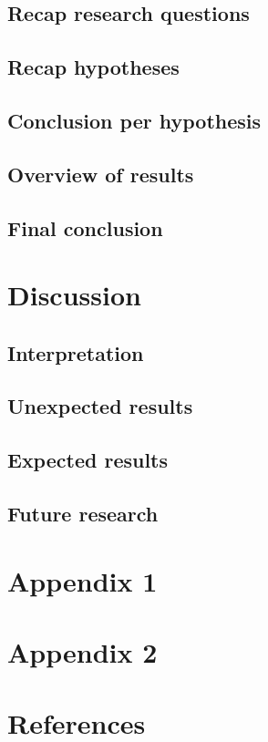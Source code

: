 \documentclass{article}
\begin{document}
 \subsection{Recap research questions}
 \subsection{Recap hypotheses}
 \subsection{Conclusion per hypothesis}
 \subsection{Overview of results}
 \subsection{Final conclusion}
 
 \section{Discussion}
 \subsection{Interpretation}
 \subsection{Unexpected results}
 \subsection{Expected results}
 \subsection{Future research}
 
 \begin{appendices}
  \section{Appendix 1}
  \section{Appendix 2}
 \end{appendices}
 
 \section*{References}
 
 
\end{document}

